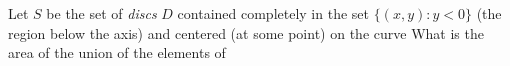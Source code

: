 Let $S$ be the set of \textit{discs} $D$ contained completely in the set $\{ (x,y) : y<0\}$ (the region below the axis) and centered (at some point) on the curve  What is the area of the union of the elements of 